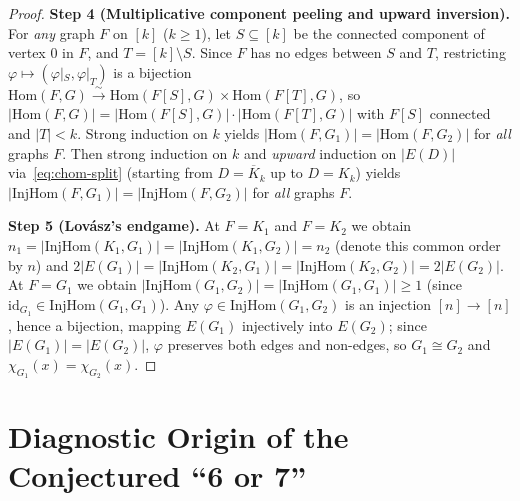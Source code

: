 \documentclass[11pt]{article}
\theoremstyle{definition}
\newcommand{\Hom}{\mathrm{Hom}}
\newcommand{\InjHom}{\mathrm{InjHom}}
\begin{document}
\begin{proof}
\textbf{Step 4 (Multiplicative component peeling and upward inversion).} For \emph{any} graph $F$ on $[k]$ ($k \ge 1$), let $S \subseteq [k]$ be the connected component of vertex $0$ in $F$, and $T = [k] \setminus S$. Since $F$ has no edges between $S$ and $T$, restricting $\varphi \mapsto (\varphi|_S, \varphi|_T)$ is a bijection $\Hom(F, G) \xrightarrow{\sim} \Hom(F[S], G) \times \Hom(F[T], G)$, so $|\Hom(F, G)| = |\Hom(F[S], G)| \cdot |\Hom(F[T], G)|$ with $F[S]$ connected and $|T| < k$. Strong induction on $k$ yields $|\Hom(F, G_1)| = |\Hom(F, G_2)|$ for \emph{all} graphs $F$. Then strong induction on $k$ and \emph{upward} induction on $|E(D)|$ via~\eqref{eq:chom-split} (starting from $D = \overline{K}_k$ up to $D = K_k$) yields $|\InjHom(F, G_1)| = |\InjHom(F, G_2)|$ for \emph{all} graphs $F$.

\textbf{Step 5 (Lov\'asz's endgame).} At $F = K_1$ and $F = K_2$ we obtain $n_1 = |\InjHom(K_1, G_1)| = |\InjHom(K_1, G_2)| = n_2$ (denote this common order by $n$) and $2|E(G_1)| = |\InjHom(K_2, G_1)| = |\InjHom(K_2, G_2)| = 2|E(G_2)|$. At $F = G_1$ we obtain $|\InjHom(G_1, G_2)| = |\InjHom(G_1, G_1)| \ge 1$ (since $\mathrm{id}_{G_1} \in \InjHom(G_1, G_1)$). Any $\varphi \in \InjHom(G_1, G_2)$ is an injection $[n] \to [n]$, hence a bijection, mapping $E(G_1)$ injectively into $E(G_2)$; since $|E(G_1)| = |E(G_2)|$, $\varphi$ preserves both edges and non-edges, so $G_1 \cong G_2$ and $\chi_{G_1}(x) = \chi_{G_2}(x)$.
\end{proof}

\section{Diagnostic Origin of the Conjectured ``6 or 7''}
\end{document}
